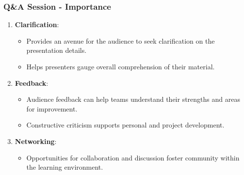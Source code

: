 \documentclass[aspectratio=169]{beamer}
\begin{document}
\begin{frame}[fragile]
    \frametitle{Q\&A Session - Importance}
    \begin{enumerate}
        \item \textbf{Clarification}:
        \begin{itemize}
            \item Provides an avenue for the audience to seek clarification on the presentation details.
            \item Helps presenters gauge overall comprehension of their material.
        \end{itemize}
        
        \item \textbf{Feedback}:
        \begin{itemize}
            \item Audience feedback can help teams understand their strengths and areas for improvement.
            \item Constructive criticism supports personal and project development.
        \end{itemize}
        
        \item \textbf{Networking}:
        \begin{itemize}
            \item Opportunities for collaboration and discussion foster community within the learning environment.
        \end{itemize}
    \end{enumerate}
\end{frame}
\end{document}
